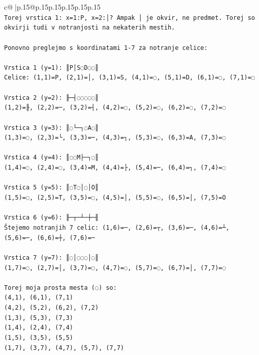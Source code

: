 \documentclass{article}
\begin{document}
{\begin{supertabular}{c@{$\;$}|p{.15\linewidth}@{}p{.15\linewidth}p{.15\linewidth}p{.15\linewidth}p{.15\linewidth}p{.15\linewidth}}
{{{\\ 
\texttt{Torej vrstica 1: x=1:P, x=2:│? Ampak │ je okvir, ne predmet. Torej so okvirji tudi v notranjosti na nekaterih mestih.} \\
\\ 
\texttt{Ponovno preglejmo s koordinatami 1{-}7 za notranje celice:} \\
\\ 
\texttt{Vrstica 1 (y=1): ║P│S◌D◌◌║} \\
\texttt{Celice: (1,1)=P, (2,1)=│, (3,1)=S, (4,1)=◌, (5,1)=D, (6,1)=◌, (7,1)=◌} \\
\\ 
\texttt{Vrstica 2 (y=2): ╟─┤◌◌◌◌◌║} \\
\texttt{(1,2)=╟, (2,2)=─, (3,2)=┤, (4,2)=◌, (5,2)=◌, (6,2)=◌, (7,2)=◌} \\
\\ 
\texttt{Vrstica 3 (y=3): ║◌└─┐◌A◌║} \\
\texttt{(1,3)=◌, (2,3)=└, (3,3)=─, (4,3)=┐, (5,3)=◌, (6,3)=A, (7,3)=◌} \\
\\ 
\texttt{Vrstica 4 (y=4): ║◌◌M├─┐◌║} \\
\texttt{(1,4)=◌, (2,4)=◌, (3,4)=M, (4,4)=├, (5,4)=─, (6,4)=┐, (7,4)=◌} \\
\\ 
\texttt{Vrstica 5 (y=5): ║◌T◌│◌│O║} \\
\texttt{(1,5)=◌, (2,5)=T, (3,5)=◌, (4,5)=│, (5,5)=◌, (6,5)=│, (7,5)=O} \\
\\ 
\texttt{Vrstica 6 (y=6): ╟─┬─┴─┼─╢} \\
\texttt{Štejemo notranjih 7 celic: (1,6)=─, (2,6)=┬, (3,6)=─, (4,6)=┴, (5,6)=─, (6,6)=┼, (7,6)=─} \\
\\ 
\texttt{Vrstica 7 (y=7): ║◌│◌◌◌│◌║} \\
\texttt{(1,7)=◌, (2,7)=│, (3,7)=◌, (4,7)=◌, (5,7)=◌, (6,7)=│, (7,7)=◌} \\
\\ 
\texttt{Torej moja prosta mesta (◌) so:} \\
\texttt{(4,1), (6,1), (7,1)} \\
\texttt{(4,2), (5,2), (6,2), (7,2)} \\
\texttt{(1,3), (5,3), (7,3)} \\
\texttt{(1,4), (2,4), (7,4)} \\
\texttt{(1,5), (3,5), (5,5)} \\
\texttt{(1,7), (3,7), (4,7), (5,7), (7,7)} \\
}}}
\end{supertabular}}
\end{document}
